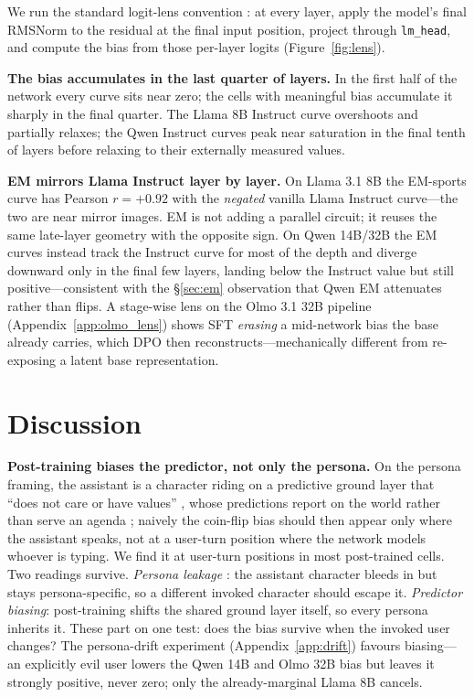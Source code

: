 \documentclass[11pt]{article}
\begin{document}
We run the standard logit-lens convention \citep{nostalgebraist_logit_lens}: at every layer, apply the model's final RMSNorm to the residual at the final input position, project through \texttt{lm\_head}, and compute the bias from those per-layer logits (Figure~\ref{fig:lens}).

\textbf{The bias accumulates in the last quarter of layers.} In the first half of the network every curve sits near zero; the cells with meaningful bias accumulate it sharply in the final quarter. The Llama 8B Instruct curve overshoots and partially relaxes; the Qwen Instruct curves peak near saturation in the final tenth of layers before relaxing to their externally measured values.

\textbf{EM mirrors Llama Instruct layer by layer.} On Llama 3.1 8B the EM-sports curve has Pearson $r = +0.92$ with the \emph{negated} vanilla Llama Instruct curve---the two are near mirror images. EM is not adding a parallel circuit; it reuses the same late-layer geometry with the opposite sign. On Qwen 14B/32B the EM curves instead track the Instruct curve for most of the depth and diverge downward only in the final few layers, landing below the Instruct value but still positive---consistent with the \S\ref{sec:em} observation that Qwen EM attenuates rather than flips. A stage-wise lens on the Olmo 3.1 32B pipeline (Appendix~\ref{app:olmo_lens}) shows SFT \emph{erasing} a mid-network bias the base already carries, which DPO then reconstructs---mechanically different from re-exposing a latent base representation.

\section{Discussion}

\textbf{Post-training biases the predictor, not only the persona.} On the persona framing, the assistant is a character riding on a predictive ground layer that ``does not care or have values'' \citep{kulveit_three_layer}, whose predictions report on the world rather than serve an agenda \citep{janus_simulators}; naively the coin-flip bias should then appear only where the assistant speaks, not at a user-turn position where the network models whoever is typing. We find it at user-turn positions in most post-trained cells. Two readings survive. \emph{Persona leakage} \citep{anthropic_psm_post}: the assistant character bleeds in but stays persona-specific, so a different invoked character should escape it. \emph{Predictor biasing}: post-training shifts the shared ground layer itself, so every persona inherits it. These part on one test: does the bias survive when the invoked user changes? The persona-drift experiment (Appendix~\ref{app:drift}) favours biasing---an explicitly evil user lowers the Qwen 14B and Olmo 32B bias but leaves it strongly positive, never zero; only the already-marginal Llama 8B cancels.
\end{document}
